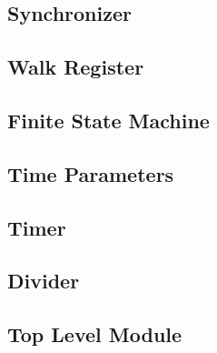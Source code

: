 \documentclass{article}
\begin{document}
	\newpage
	\subsection{Synchronizer}
		\begin{lgrind}
		
		\end{lgrind}

	\newpage
	\subsection{Walk Register}
		\begin{lgrind}
		
		\end{lgrind}

	\newpage
	\subsection{Finite State Machine}
		\begin{lgrind}
		
		\end{lgrind}

	\newpage
	\subsection{Time Parameters}
		\begin{lgrind}
		
		\end{lgrind}

	\newpage
	\subsection{Timer}
		\begin{lgrind}
		
		\end{lgrind}

	\newpage
	\subsection{Divider}
		\begin{lgrind}
		
		\end{lgrind}

	\newpage
	\subsection{Top Level Module}
		\begin{lgrind}
		
		\end{lgrind}
\end{document}

